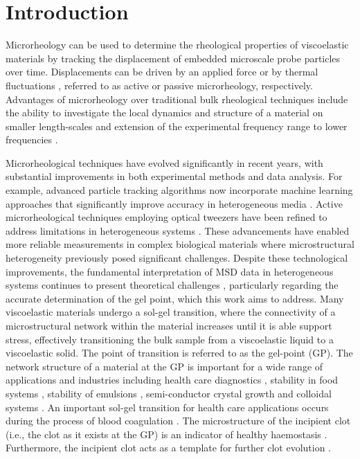 \documentclass[%
 aip,
 amsmath,amssymb,
reprint, onecolumn %
]{revtex4-1}
\begin{document}
\section{Introduction}

Microrheology can be used to determine the rheological properties of viscoelastic materials by tracking the displacement of embedded microscale probe particles over time. Displacements can be driven by an applied force \cite{Bausch1999,Gardel2005,Cappella2005} or by thermal fluctuations \cite{Oppong2006}, referred to as active or passive microrheology, respectively. Advantages of microrheology over traditional bulk rheological techniques include the ability to investigate the local dynamics and structure of a material on smaller length-scales and extension of the experimental frequency range to lower frequencies \cite{Larsen2008,Moschakis2013}.

Microrheological techniques have evolved significantly in recent years, with substantial improvements in both experimental methods and data analysis. For example, advanced particle tracking algorithms now incorporate machine learning approaches that significantly improve accuracy in heterogeneous media \cite{Koens2018}. Active microrheological techniques employing optical tweezers have been refined to address limitations in heterogeneous systems \cite{Tassieri2019}. These advancements have enabled more reliable measurements in complex biological materials where microstructural heterogeneity previously posed significant challenges. Despite these technological improvements, the fundamental interpretation of MSD data in heterogeneous systems continues to present theoretical challenges \cite{Waigh2022}, particularly regarding the accurate determination of the gel point, which this work aims to address.
Many viscoelastic materials undergo a sol-gel transition, where the connectivity of a microstructural network within the material increases until it is able support stress, effectively transitioning the bulk sample from a viscoelastic liquid to a viscoelastic solid. The point of transition is referred to as the gel-point (GP). The network structure of a material at the GP is important for a wide range of applications and industries including health care diagnostics \cite{Evans2010a,Evans2008,Evans2010b}, stability in food systems \cite{Moschakis2013}, stability of emulsions \cite{Oliveira2010}, semi-conductor crystal growth \cite{Spanhel1991} and colloidal systems \cite{Coniglio2004}. An important sol-gel transition for health care applications occurs during the process of blood coagulation \cite{Curtis2014,Badiei2015,Hawkins2010}. The microstructure of the incipient clot (i.e., the clot as it exists at the GP) is an indicator of healthy haemostasis \cite{Collet2000,Collet2005,Weisel2007}. Furthermore, the incipient clot acts as a template for further clot evolution \cite{Curtis2013}.
\end{document}
